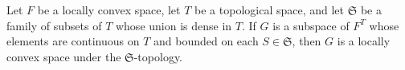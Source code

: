 Let \(F\) be a locally convex space, let \(T\) be a topological space, and let \(\mathfrak{S}\) be a family of subsets of \(T\) whose union is dense in \(T\). If \(G\) is a subspace of \(F^T\) whose elements are continuous on \(T\) and bounded on each \(S \in \mathfrak{S}\), then \(G\) is a locally convex space under the \(\mathfrak{S}\)-topology.
